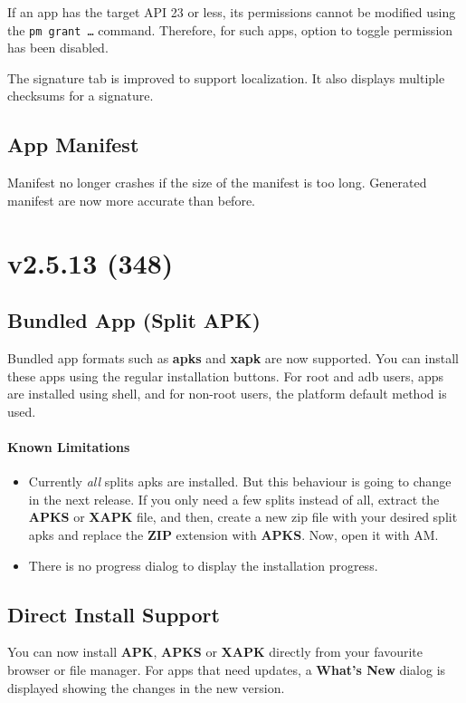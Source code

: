 If an app has the target API 23 or less, its permissions cannot be modified using the \texttt{pm grant \ldots} command.
Therefore, for such apps, option to toggle permission has been disabled.

The signature tab is improved to support localization. It also displays multiple checksums for a signature.

\subsection{App Manifest}
Manifest no longer crashes if the size of the manifest is too long. Generated manifest are now more accurate than before.

\section{v2.5.13 (348)}

\subsection{Bundled App (Split APK)}
Bundled app formats such as \textbf{apks} and \textbf{xapk} are now supported. You can install these apps using
the regular installation buttons. For root and adb users, apps are installed using shell, and for non-root users,
the platform default method is used.

\paragraph{Known Limitations}
\begin{itemize}
    \item Currently \textit{all} splits apks are installed. But this behaviour is going to change in the next release.
    If you only need a few splits instead of all, extract the \textbf{APKS} or \textbf{XAPK} file, and then, create a new zip
    file with your desired split apks and replace the \textbf{ZIP} extension with \textbf{APKS}. Now, open it with AM.
    \item There is no progress dialog to display the installation progress.
\end{itemize}

\subsection{Direct Install Support}
You can now install \textbf{APK}, \textbf{APKS} or \textbf{XAPK} directly from your favourite browser or file manager.
For apps that need updates, a \textbf{What's New} dialog is displayed showing the changes in the new version.

